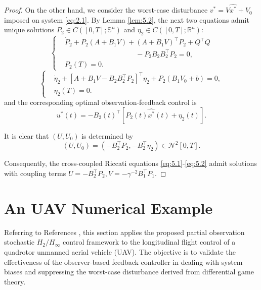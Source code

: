 \documentclass[lettersize,journal]{IEEEtran}
\theoremstyle{plain}
\theoremstyle{definition}
\begin{document}
\begin{proof}
	On the other hand, we consider the worst-case disturbance $v^* = V\widehat{x^*} + V_0$ imposed on system \eqref{eq:2.1}. By Lemma \ref{lem:5.2}, the next two equations admit unique solutions $P_2 \in C([0,T];\mathbb{S}^n)$ and $\eta_2 \in C([0,T];\mathbb{R}^n)$:
	\begin{equation*}
		\left\{
		\begin{aligned}
			&\dot{P}_2 + P_2(A + B_1V) + (A + B_1V)^{\top}P_2 + Q^{\top}Q \\
			&\qquad\qquad\qquad\qquad\qquad - P_2 B_2 B_2^{\top} P_2 = 0,\\
			&P_2(T) = 0.
		\end{aligned}
		\right.
	\end{equation*}
	\begin{equation*}
		\left\{
		\begin{aligned}
			&\dot{\eta}_2 + [A + B_1V - B_2B_2^{\top}P_2]^{\top}\eta_2 + P_2(B_1V_0 + b) = 0,\\
			&\eta_2(T) = 0.
		\end{aligned}
		\right.
	\end{equation*}
	and the corresponding optimal observation-feedback control is
	\begin{equation*}
		u^*(t) = -B_2(t)^{\top}[P_2(t)\widehat{x^*}(t) + \eta_2(t)].
	\end{equation*}
	
	It is clear that $(U,U_0)$ is determined by
	\begin{equation*}
		(U,U_0) = (-B_2^{\top}P_2,-B_2^{\top}\eta_2) \in \mathcal{N}^2[0,T].
	\end{equation*}
	
	Consequently, the cross-coupled Riccati equations \eqref{eq:5.1}-\eqref{eq:5.2} admit solutions with coupling terms $U = -B_2^{\top}P_2, V = -\gamma^{-2}B_1^{\top}P_1$.
\end{proof}

\section{An UAV Numerical Example}\label{sec6}
Referring to References \cite{Qi2025,Hui2024,Hasanlu2025,Ming2023,Shi2018}, this section applies the proposed partial observation stochastic $H_{2}/H_{\infty}$ control framework to the longitudinal flight control of a quadrotor unmanned aerial vehicle (UAV). The objective is to validate the effectiveness of the observer-based feedback controller in dealing with system biases and suppressing the worst-case disturbance derived from differential game theory.
\end{document}
